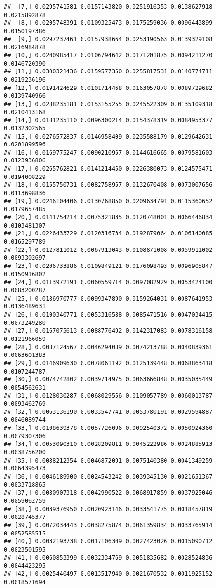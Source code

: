 \documentclass[]{article}
\begin{document}
\begin{verbatim}
##  [7,] 0.0295741581 0.0157143820 0.0251916353 0.0138627918 0.0215892878
##  [8,] 0.0205748391 0.0109325473 0.0175259036 0.0096443899 0.0150197386
##  [9,] 0.0297237461 0.0157938664 0.0253190563 0.0139329108 0.0216984878
## [10,] 0.0200985417 0.0106794642 0.0171201875 0.0094211270 0.0146720390
## [11,] 0.0300321436 0.0159577350 0.0255817531 0.0140774711 0.0219236196
## [12,] 0.0191424629 0.0101714468 0.0163057878 0.0089729682 0.0139740966
## [13,] 0.0288235181 0.0153155255 0.0245522309 0.0135109318 0.0210413168
## [14,] 0.0181235110 0.0096300214 0.0154378319 0.0084953377 0.0132302565
## [15,] 0.0276572837 0.0146958409 0.0235588179 0.0129642631 0.0201899596
## [16,] 0.0169775247 0.0090210957 0.0144616665 0.0079581603 0.0123936806
## [17,] 0.0265762821 0.0141214450 0.0226380073 0.0124575471 0.0194008229
## [18,] 0.0155750731 0.0082758957 0.0132670408 0.0073007656 0.0113698836
## [19,] 0.0246104406 0.0130768850 0.0209634791 0.0115360652 0.0179657485
## [20,] 0.0141754214 0.0075321835 0.0120748001 0.0066446834 0.0103481307
## [21,] 0.0226433729 0.0120316734 0.0192879064 0.0106140085 0.0165297789
## [22,] 0.0127811012 0.0067913043 0.0108871008 0.0059911002 0.0093302697
## [23,] 0.0206733886 0.0109849121 0.0176098493 0.0096905847 0.0150916802
## [24,] 0.0113972191 0.0060559714 0.0097082929 0.0053424100 0.0083200287
## [25,] 0.0186970777 0.0099347890 0.0159264031 0.0087641953 0.0136489631
## [26,] 0.0100340771 0.0053316588 0.0085471516 0.0047034415 0.0073249280
## [27,] 0.0167075613 0.0088776492 0.0142317083 0.0078316158 0.0121966059
## [28,] 0.0087124567 0.0046294089 0.0074213788 0.0040839361 0.0063601383
## [29,] 0.0146909630 0.0078061192 0.0125139448 0.0068863418 0.0107244787
## [30,] 0.0074742802 0.0039714975 0.0063666848 0.0035035449 0.0054562631
## [31,] 0.0128030287 0.0068029556 0.0109057789 0.0060013787 0.0093462769
## [32,] 0.0063136190 0.0033547741 0.0053780191 0.0029594887 0.0046089744
## [33,] 0.0108639378 0.0057726096 0.0092540372 0.0050924360 0.0079307306
## [34,] 0.0053090310 0.0028209811 0.0045222986 0.0024885913 0.0038756200
## [35,] 0.0088212354 0.0046872091 0.0075140380 0.0041349259 0.0064395473
## [36,] 0.0046189900 0.0024543242 0.0039345130 0.0021651367 0.0033718865
## [37,] 0.0080907318 0.0042990522 0.0068917859 0.0037925046 0.0059062759
## [38,] 0.0039376950 0.0020923146 0.0033541775 0.0018457819 0.0028745377
## [39,] 0.0072034443 0.0038275874 0.0061359834 0.0033765914 0.0052585515
## [40,] 0.0032193738 0.0017106309 0.0027423026 0.0015090712 0.0023501595
## [41,] 0.0060853399 0.0032334769 0.0051835682 0.0028524836 0.0044423295
## [42,] 0.0025440497 0.0013517940 0.0021670532 0.0011925152 0.0018571694

\end{verbatim}
\end{document}
